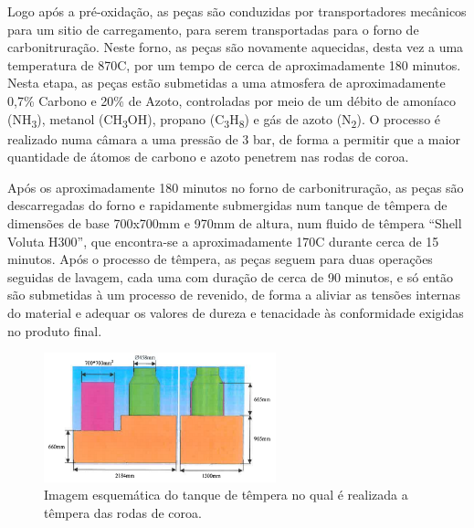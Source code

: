 \par
Logo após a pré-oxidação, as peças são conduzidas por transportadores mecânicos para um sitio de carregamento, para serem transportadas para o forno de carbonitruração. Neste forno, as peças são novamente aquecidas, desta vez a uma temperatura de 870\textdegree C, por um tempo de cerca de aproximadamente 180 minutos. Nesta etapa, as peças estão submetidas a uma atmosfera de aproximadamente 0,7\% Carbono e 20\% de Azoto, controladas por meio de um débito de amoníaco (NH\textsubscript{3}), metanol (CH\textsubscript{3}OH), propano (C\textsubscript{3}H\textsubscript{8}) e gás de azoto (N\textsubscript{2}). O processo é realizado numa câmara a uma pressão de 3 bar, de forma a permitir que a maior quantidade de átomos de carbono e azoto penetrem nas rodas de coroa.
\par
Após os aproximadamente 180 minutos no forno de carbonitruração, as peças são descarregadas do forno e rapidamente submergidas num tanque de têmpera de dimensões de base 700x700mm e  970mm de altura, num fluido de têmpera “Shell Voluta H300”, que encontra-se a aproximadamente 170\textdegree C durante cerca de 15 minutos. Após o processo de têmpera, as peças seguem para duas operações seguidas de lavagem, cada uma com duração de cerca de 90 minutos, e só então são submetidas à um processo de revenido, de forma a aliviar as tensões internas do material e adequar os valores de dureza e tenacidade às conformidade exigidas no produto final.
\begin{figure}[htb]
    \centering
    \includegraphics[width = 0.6\textwidth]{Figures/Cap3/Tanque_Tempera.png}
    \caption[Tanque de têmpera]%
    {Imagem esquemática do tanque de têmpera no qual é realizada a têmpera das rodas de coroa.}
    \label{fig:tanque_tempera}
\end{figure}

